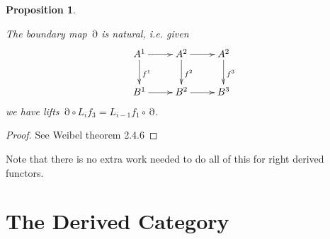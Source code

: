 \documentclass[10pt,]{book}
\theoremstyle{plain}
\newtheorem{proposition}[theorem]{Proposition}
\theoremstyle{definition}
\numberwithin{equation}{section}
\DeclareMathOperator{\dd}{\partial}
\begin{document}
\begin{proposition}\label{proposition-1}

            The boundary map \(\dd\) is natural, i.e. given 
            \[
              \xymatrix{
                A^1 \ar[r]\ar[d]^{f^1} &
                A^2 \ar[r]\ar[d]^{f^2} &
                A^2 \ar[d]^{f^3} \\
                B^1 \ar[r] &
                B^2 \ar[r] &
                B^3 \\
              }
            \]
            we have lifts \(\dd\circ L_i f_3 = L_{i-1} f_1 \circ \dd\).
          \end{proposition}
\begin{proof}
See Weibel theorem 2.4.6 \end{proof}
\par

          Note that there is no extra work needed to do all of this for right derived functors.
\typeout{************************************************}
\typeout{************************************************}
\section[The Derived Category]{The Derived Category}\label{sec-derived}
\end{document}
